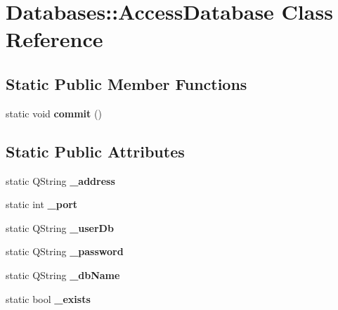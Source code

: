 \hypertarget{classDatabases_1_1AccessDatabase}{\section{Databases\-:\-:Access\-Database Class Reference}
\label{classDatabases_1_1AccessDatabase}
}
\subsection*{Static Public Member Functions}
\begin{DoxyCompactItemize}
\item 
\hypertarget{classDatabases_1_1AccessDatabase_ac1a811b4c3d017665c95cc23740d90f9}{static void {\bfseries commit} ()}\label{classDatabases_1_1AccessDatabase_ac1a811b4c3d017665c95cc23740d90f9}

\end{DoxyCompactItemize}
\subsection*{Static Public Attributes}
\begin{DoxyCompactItemize}
\item 
\hypertarget{classDatabases_1_1AccessDatabase_a55d2effa9db8712ed59e1c812d0976a5}{static Q\-String {\bfseries \-\_\-address}}\label{classDatabases_1_1AccessDatabase_a55d2effa9db8712ed59e1c812d0976a5}

\item 
\hypertarget{classDatabases_1_1AccessDatabase_a3a0d5ea34848774e22513478bc8f2438}{static int {\bfseries \-\_\-port}}\label{classDatabases_1_1AccessDatabase_a3a0d5ea34848774e22513478bc8f2438}

\item 
\hypertarget{classDatabases_1_1AccessDatabase_ab8bce721fe627ad70763584d590c74f0}{static Q\-String {\bfseries \-\_\-user\-Db}}\label{classDatabases_1_1AccessDatabase_ab8bce721fe627ad70763584d590c74f0}

\item 
\hypertarget{classDatabases_1_1AccessDatabase_a8784a122fe511b200fd8e2fa1c327ac6}{static Q\-String {\bfseries \-\_\-password}}\label{classDatabases_1_1AccessDatabase_a8784a122fe511b200fd8e2fa1c327ac6}

\item 
\hypertarget{classDatabases_1_1AccessDatabase_a754d01d8f769d85e360f6a06380ff4a9}{static Q\-String {\bfseries \-\_\-db\-Name}}\label{classDatabases_1_1AccessDatabase_a754d01d8f769d85e360f6a06380ff4a9}

\item 
\hypertarget{classDatabases_1_1AccessDatabase_a4041377d9c32522f62a70d750d34e581}{static bool {\bfseries \-\_\-exists}}\label{classDatabases_1_1AccessDatabase_a4041377d9c32522f62a70d750d34e581}

\end{DoxyCompactItemize}


